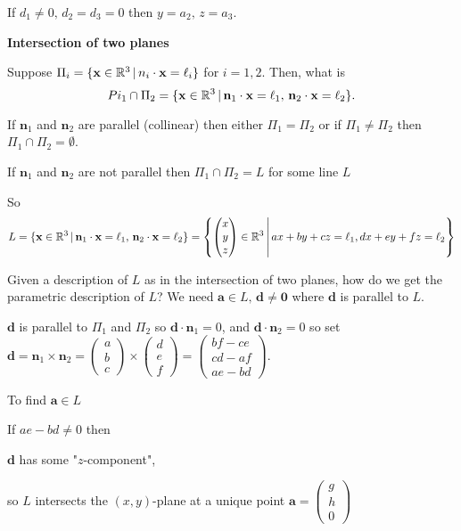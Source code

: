 \documentclass[10pt, a4paper]{article}
\newcommand{\mbf}[1]{\mathbf{#1}}
\begin{document}
If $d_1 \neq 0,\,d_2 = d_3 = 0$ then $y = a_2,\, z = a_3$.


\textbf{Intersection of two planes}

Suppose $\Pi_i = \{\mbf{x} \in \R ^ 3 \,|\, n_i \cdot \mbf{x} = \ell_i\}$ for $i = 1, 2$. Then, what is
\[
Pi_1 \cap \Pi_2 = \{\mbf{x}\in \R ^ 3 \,|\, \mbf{n}_1 \cdot \mbf{x} = \ell_1,\,\mbf{n}_2 \cdot \mbf{x} = \ell_2\}.
\]

If $\mbf{n}_1$ and $\mbf{n}_2$ are parallel (collinear) then either $\Pi_1 = \Pi_2$ or if $\Pi_1 \neq \Pi_2$ then $\Pi_1 \cap \Pi_2 = \emptyset$.

If $\mbf{n}_1$ and $\mbf{n}_2$ are not parallel then $\Pi_1 \cap \Pi_2 = L$ for some line $L$

So 
\[L = \{\mbf{x}\in \R ^ 3 \,|\, \mbf{n}_1 \cdot \mbf{x} = \ell_1,\,\mbf{n}_2 \cdot \mbf{x} = \ell_2\} = \left\{\begin{pmatrix}
    x \\ y \\ z
\end{pmatrix} \in \R ^ 3\, \middle|\,
    ax + by + cz = \ell_1,
    dx + ey + fz = \ell_2
\right\}
\]

Given a description of $L$ as in the intersection of two planes, how do we get the parametric description of $L$?
We need $\mbf{a} \in L,\,\mbf{d \neq 0}$ where $\mbf{d}$ is parallel to $L$.

$\mbf{d}$ is parallel to $\Pi_1$ and $\Pi_2$ so $\mbf{d} \cdot \mbf{n}_1 = 0$, and $\mbf{d} \cdot \mbf{n}_2 = 0$ so set $\mbf{d} = \mbf{n}_1 \times \mbf{n}_2 = \begin{pmatrix}
    a \\ b \\ c
\end{pmatrix} \times \begin{pmatrix}
    d \\ e \\ f
\end{pmatrix} = \begin{pmatrix}
    bf - ce \\
    cd - af \\
    ae - bd
\end{pmatrix}$.

To find $\mbf{a} \in L$

If $ae - bd \neq 0$ then

$\mbf{d}$ has some "$z$-component",

so $L$ intersects the $(x, y)$-plane at a unique point $\mbf{a} = \begin{pmatrix}
    g \\ h \\ 0
\end{pmatrix}$
\end{document}
